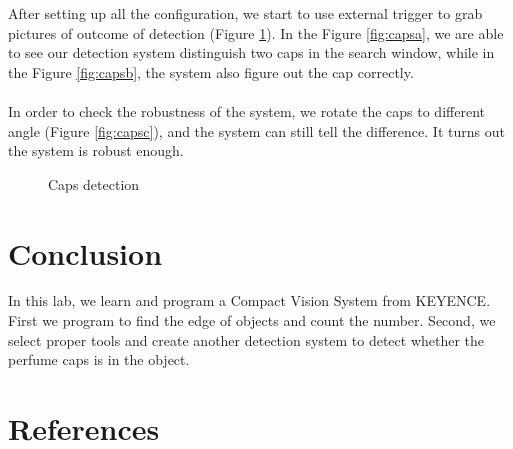 \documentclass[english]{article}
\begin{document}
After setting up all the configuration, we start to use external trigger to grab pictures of outcome of detection (Figure \ref{fig:caps}). In the Figure \ref{fig:capsa}, we are able to see our detection system distinguish two caps in the search window, while in the Figure \ref{fig:capsb}, the system also figure out the cap correctly.\\
\\
In order to check the robustness of the system, we rotate the caps to different angle (Figure \ref{fig:capsc}), and the system can still tell the difference. It turns out the system is robust enough.

\begin{figure}[H]
	\centering
	\caption{Caps detection}
	\label{fig:caps}
\end{figure}

\section{Conclusion}
In this lab, we learn and program a Compact Vision System from KEYENCE. First we program to find the edge of objects and count the number. Second, we select proper tools and  create another detection system to detect whether the perfume caps is in the object.
\section{References}
\end{document}
